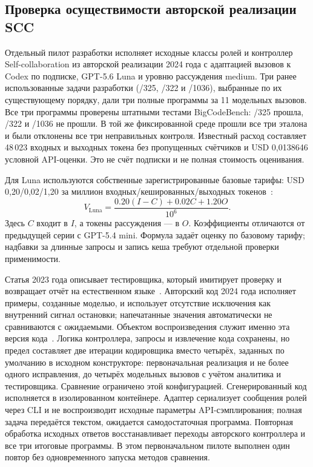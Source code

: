 \subsection{Проверка осуществимости авторской реализации SCC}
\label{sec:scc-feasibility}
Отдельный пилот разработки исполняет исходные классы ролей и контроллер Self-collaboration из авторской реализации 2024 года с адаптацией вызовов к Codex по подписке, GPT-5.6 Luna и уровню рассуждения medium. Три ранее использованные задачи разработки (/325, /322 и /1036), выбранные по их существующему порядку, дали три полные программы за 11 модельных вызовов. Все три программы проверены штатными тестами BigCodeBench: /325 прошла, /322 и /1036 не прошли. В той же фиксированной среде прошли все три эталона и были отклонены все три неправильных контроля. Известный расход составляет 48\,023 входных и выходных токена без пропущенных счётчиков и USD 0{,}0138646 условной API-оценки. Это не счёт подписки и не полная стоимость оценивания.

Для Luna используются собственные зарегистрированные базовые тарифы: USD 0{,}20/0{,}02/1{,}20 за миллион входных/кешированных/выходных токенов~\cite{openai56luna2026}:
\[
V_{\mathrm{Luna}}=\frac{0.20(I-C)+0.02C+1.20O}{10^6}.
\]
Здесь $C$ входит в $I$, а токены рассуждения --- в $O$. Коэффициенты отличаются от предыдущей серии с GPT-5.4 mini. Формула задаёт оценку по базовому тарифу; надбавки за длинные запросы и запись кеша требуют отдельной проверки применимости.

Статья 2023 года описывает тестировщика, который имитирует проверку и возвращает отчёт на естественном языке~\cite{dong2023selfcollaboration}. Авторский код 2024 года исполняет примеры, созданные моделью, и использует отсутствие исключения как внутренний сигнал остановки; напечатанные значения автоматически не сравниваются с ожидаемыми. Объектом воспроизведения служит именно эта версия кода~\cite{scc2024source}. Логика контроллера, запросы и извлечение кода сохранены, но предел составляет две итерации кодировщика вместо четырёх, заданных по умолчанию в исходном конструкторе: первоначальная реализация и не более одного исправления, до четырёх модельных вызовов с учётом аналитика и тестировщика. Сравнение ограничено этой конфигурацией. Сгенерированный код исполняется в изолированном контейнере. Адаптер сериализует сообщения ролей через CLI и не воспроизводит исходные параметры API-сэмплирования; полная задача передаётся текстом, ожидается самодостаточная программа. Повторная обработка исходных ответов восстанавливает переходы авторского контроллера и все три итоговые программы. В этом первоначальном пилоте выполнен один повтор без одновременного запуска методов сравнения.

